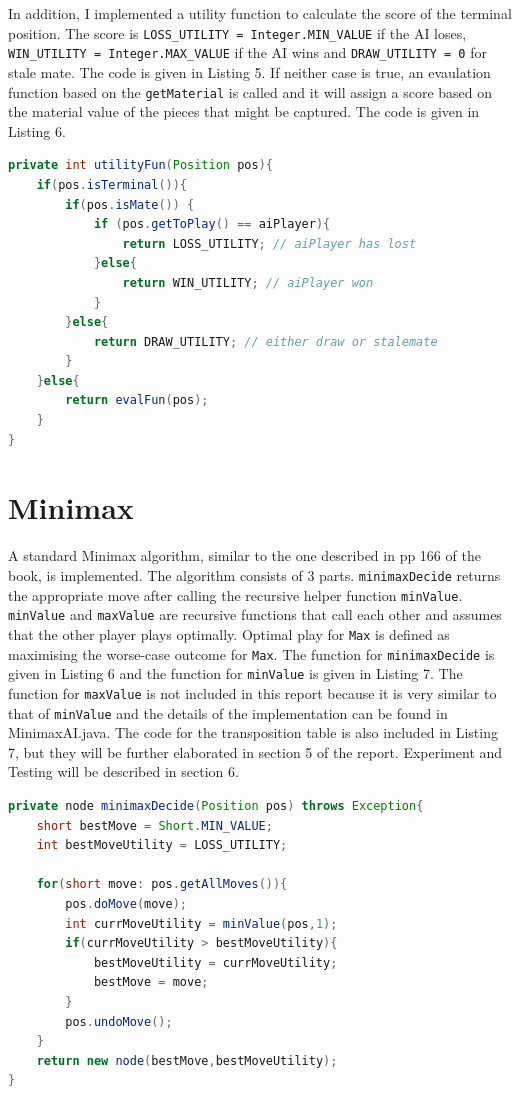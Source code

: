 \documentclass[9.5pt]{extarticle}
\begin{document}
In addition, I implemented a utility function to calculate the score of the terminal position. The score is \verb`LOSS_UTILITY = Integer.MIN_VALUE` if the AI loses, \verb`WIN_UTILITY = Integer.MAX_VALUE` if the AI wins and \verb`DRAW_UTILITY = 0` for stale mate. The code is given in Listing 5. If neither case is true, an evaulation function based on the \verb`getMaterial` is called and it will assign a score based on the material value of the pieces that might be captured. The code is given in Listing 6.

\begin{lstlisting}[language=java,caption={Java code for utilityFun}]
private int utilityFun(Position pos){
	if(pos.isTerminal()){
		if(pos.isMate()) {
			if (pos.getToPlay() == aiPlayer){
				return LOSS_UTILITY; // aiPlayer has lost
			}else{
				return WIN_UTILITY; // aiPlayer won
			}
		}else{
			return DRAW_UTILITY; // either draw or stalemate
		}
	}else{
		return evalFun(pos);
	}
}
\end{lstlisting}

\section{Minimax}

A standard Minimax algorithm, similar to the one described in pp 166 of the book, is implemented. The algorithm consists of 3 parts. \verb`minimaxDecide`  returns the appropriate move after calling the recursive helper function \verb`minValue`. \verb`minValue` and \verb`maxValue` are recursive functions that call each other and assumes that the other player plays optimally. Optimal play for \verb`Max` is defined as maximising the worse-case outcome for \verb`Max`. The function for \verb`minimaxDecide` is given in Listing 6 and the function for \verb`minValue` is given in Listing 7. The function for \verb`maxValue` is not included in this report because it is very similar to that of \verb`minValue` and the details of the implementation can be found in MinimaxAI.java. The code for the transposition table is also included in Listing 7, but they will be further elaborated in section 5 of the report. Experiment and Testing will be described in section 6.

\begin{lstlisting}[language=java,caption={Java code for minimaxDecide for minimax algorithm}]
private node minimaxDecide(Position pos) throws Exception{
	short bestMove = Short.MIN_VALUE;
	int bestMoveUtility = LOSS_UTILITY;
	
	for(short move: pos.getAllMoves()){
		pos.doMove(move);
		int currMoveUtility = minValue(pos,1);
		if(currMoveUtility > bestMoveUtility){
			bestMoveUtility = currMoveUtility;
			bestMove = move;
		}
		pos.undoMove();
	}
	return new node(bestMove,bestMoveUtility);
}
\end{lstlisting}
\end{document}
